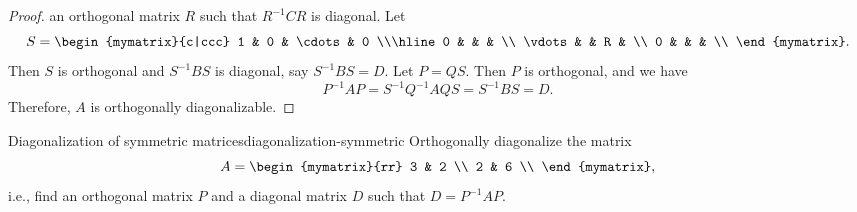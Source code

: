 \begin{proof}
  an orthogonal matrix $R$ such that $R^{-1}CR$ is diagonal. Let
  \begin{equation*}
    S = \begin{mymatrix}{c|ccc}
      1 & 0 & \cdots & 0 \\\hline
      0 &  & & \\
      \vdots & & R & \\
      0 &  & & \\
    \end{mymatrix}.
  \end{equation*}
  Then $S$ is orthogonal and $S^{-1}BS$ is diagonal, say
  $S^{-1}BS = D$. Let $P=QS$. Then $P$ is orthogonal, and we have
  \begin{equation*}
    P^{-1}AP = S^{-1}Q^{-1}AQS = S^{-1}BS = D.
  \end{equation*}
  Therefore, $A$ is orthogonally diagonalizable.
\end{proof}

\begin{example}{Diagonalization of symmetric matrices}{diagonalization-symmetric}
  Orthogonally diagonalize the matrix
  \begin{equation*}
    A = \begin{mymatrix}{rr}
      3 & 2 \\
      2 & 6 \\
    \end{mymatrix},
  \end{equation*}
  i.e., find an orthogonal matrix $P$ and a diagonal matrix $D$ such
  that $D = P^{-1}AP$.
\end{example}

